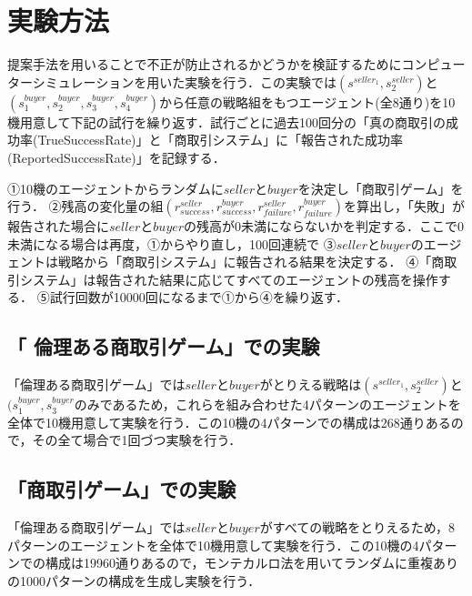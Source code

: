 \section{実験方法}
提案手法を用いることで不正が防止されるかどうかを検証するためにコンピューターシミュレーションを用いた実験を行う．この実験では$ (s^{seller_1}, s^{seller}_2) $と$ (s^{buyer}_1, s^{buyer}_2, s^{buyer}_3, s^{buyer}_4) $から任意の戦略組をもつエージェント(全8通り)を10機用意して下記の試行を繰り返す．試行ごとに過去100回分の「真の商取引の成功率(TrueSuccessRate)」と「商取引システム」に「報告された成功率(ReportedSuccessRate)」を記録する．

①10機のエージェントからランダムに$ seller $と$ buyer $を決定し「商取引ゲーム」を行う．
②残高の変化量の組$ (r^{seller}_{success}, r^{buyer}_{success}, r^{seller}_{failure}, r^{buyer}_{failure}) $を算出し，「失敗」が報告された場合に$ seller $と$ buyer $の残高が0未満にならないかを判定する．ここで0未満になる場合は再度，①からやり直し，100回連続で
③$ seller $と$ buyer $のエージェントは戦略から「商取引システム」に報告される結果を決定する．
④「商取引システム」は報告された結果に応じてすべてのエージェントの残高を操作する．
⑤試行回数が10000回になるまで①から④を繰り返す．

\subsection{「 倫理ある商取引ゲーム」での実験}
「倫理ある商取引ゲーム」では$ seller $と$ buyer $がとりえる戦略は$ (s^{seller_1}, s^{seller}_2) $と$ (s^{buyer}_1, s^{buyer}_3 $のみであるため，これらを組み合わせた4パターンのエージェントを全体で10機用意して実験を行う．この10機の4パターンでの構成は268通りあるので，その全て場合で1回づつ実験を行う．

\subsection{「商取引ゲーム」での実験}
「倫理ある商取引ゲーム」では$ seller $と$ buyer $がすべての戦略をとりえるため，8パターンのエージェントを全体で10機用意して実験を行う．この10機の4パターンでの構成は19960通りあるので，モンテカルロ法を用いてランダムに重複ありの1000パターンの構成を生成し実験を行う．

